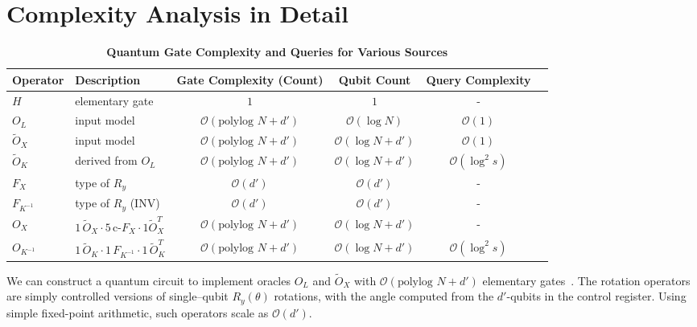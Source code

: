 \documentclass[
  reprint,
  superscriptaddress,
  amsmath,amssymb,
  aps,prl,
]{revtex4-2}
\begin{document}
\section{Complexity Analysis in Detail}
\label{appendix:complexity-analysis-in-detail}
\noindent 
\begin{table}[h]
\centering
\normalsize
\caption{\textbf{Quantum Gate Complexity and Queries for Various Sources}}
\label{tab:qmmep_complexity}
\begin{tabular}{|l|p{4cm}|c|c|c|c|}
\hline
\textbf{Operator} & \textbf{Description} & \textbf{Gate Complexity (Count)} & \textbf{Qubit Count} & \textbf{Query Complexity} \\
\hline 
\(H\) & elementary gate & \(1\) & \(1\) & - \\
\hline
\(O_L\) & input model & \(\mathcal O(\text{polylog }N+d')\)  & \(\mathcal O(\log N)\) & \(\mathcal O(1)\) \\
\hline
\(\tilde O_X\) & input model & \(\mathcal O(\text{polylog }N+d')\) & \(\mathcal O(\log N+d')\) & \(\mathcal O(1)\) \\
\hline
\(\tilde O_K\) & derived from \(O_L\) & \(\mathcal O(\text{polylog }N+d')\)  & \(\mathcal O(\log N+d')\) & \(\mathcal O(\log^2 s)\) \\
\hline
\(F_X\) & type of \(R_y\) & \(\mathcal O (d')\) & \(\mathcal O( d')\) & - \\
\hline
\(F_{K^{-1}}\) & type of \(R_y\) (INV) & \(\mathcal O (d')\) & \(\mathcal O(d')\) & - \\
\hline
\(O_X\) & \(1 \, \tilde O_X\cdot  5\, \text{c-}F_X\cdot 1  \tilde O_X^T\) &  \(\mathcal O(\text{polylog }N+d')\) & \(\mathcal O(\log N+d')\) & - \\
\hline
\(O_{K^{-1}}\) & \(1 \, \tilde O_K\cdot 1\, F_{K^{-1}}\cdot 1\, \tilde O_K^T\) &  \(\mathcal O(\text{polylog }N+d')\) & \(\mathcal O(\log N+d')\) & \(\mathcal O(\log^2 s)\) \\
\hline
\end{tabular}
\end{table}
%
\noindent We can construct a quantum circuit to implement oracles \(O_L\) and \(\tilde O_X\) with \(\mathcal O(\text{polylog }N+d')\) elementary gates~\cite{tong2021fast}. The rotation operators are simply controlled versions of single–qubit \(R_y(\theta )\) rotations, with the angle computed from the \(d'\)-qubits in the control register. Using simple fixed-point arithmetic, such operators scale as \(\mathcal O (d')\).
\end{document}

